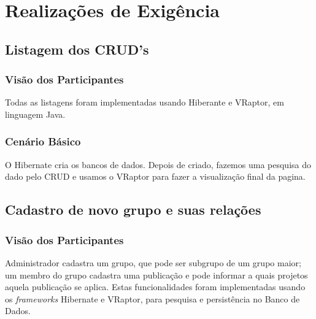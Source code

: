 \documentclass[11pt, a4paper]{article}
\begin{document}
		        

		
	\section{Realizações de Exigência}
        
        \subsection{Listagem dos CRUD's}
		
	        \subsubsection{Visão dos Participantes}
                Todas as listagens foram implementadas usando Hiberante e VRaptor, em linguagem Java.
		
	        \subsubsection{Cenário Básico}
                O Hibernate cria os bancos de dados. Depois de criado, fazemos uma pesquisa do dado pelo CRUD e usamos o VRaptor para fazer a visualização final da pagina.
					
             
        \subsection{Cadastro de novo grupo e suas relações}
		
	        \subsubsection{Visão dos Participantes}
                Administrador cadastra um grupo, que pode ser subgrupo de um grupo maior; um membro do grupo cadastra uma publicação e pode informar a quais projetos aquela publicação se aplica. Estas funcionalidades foram implementadas usando os \emph{frameworks} Hibernate e VRaptor, para pesquisa e persistência no Banco de Dados.
\end{document}
